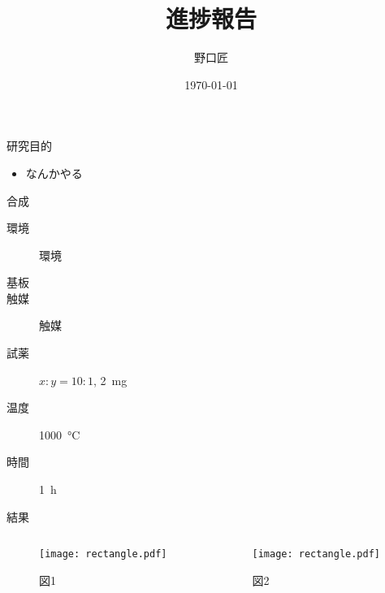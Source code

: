 \documentclass[unicode,12pt]{beamer}
\title{進捗報告}
\author{野口匠}
\institute[kut]{高知工科大学 河野研究室}
\date{\today}
\newif\if西暦 \西暦true
\begin{document}
\begin{frame}
  \titlepage
\end{frame}

\begin{frame}{研究目的}
  \begin{itemize}
    \item なんかやる
  \end{itemize}
\end{frame}

\begin{frame}{合成}
  

  \begin{description}
    \item[環境] 環境
    \item[基板] 
    \item[触媒] 触媒
    \item[試薬] $x : y = 10: 1$, \SI{2}{mg}
    \item[温度] \SI{1000}{\degreeCelsius}
    \item[時間] \SI{1}{\hour}
  \end{description}

\end{frame}


\begin{frame}{結果}
  \begin{columns}[t]
    \begin{column}{.45\linewidth}
      \begin{figure}
        \centering
        \texttt{[image: rectangle.pdf]}
        \caption{図1}
      \end{figure}
    \end{column}
    \begin{column}{.45\linewidth}
      \begin{figure}
        \centering
        \texttt{[image: rectangle.pdf]}
        \caption{図2}
      \end{figure}
    \end{column}
  \end{columns}
\end{frame}
\end{document}

